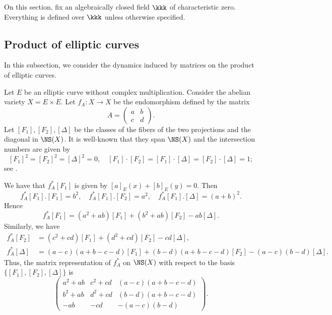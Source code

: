 On this section, fix an algebraically closed field \(\kkk\) of characteristic zero.
Everything is defined over \(\kkk\) unless otherwise specified.

\subsection{Product of elliptic curves}

    In this subsection, we consider the dynamics induced by matrices on the product of elliptic curves.

    Let \(E\) be an elliptic curve without complex multiplication.
    Consider the abelian variety \(X = E \times E\).
    Let \(f_A: X \to X\) be the endomorphism defined by the matrix
    \[ A = \begin{pmatrix}
        a & b \\
        c & d
    \end{pmatrix}. \]
    Let \([F_1], [F_2], [\Delta]\) be the classes of the fibers of the two projections and the diagonal in \(\NS(X)\).
    It is well-known that they span \(\NS(X)\) and the intersection numbers are given by
    \[ [F_1]^2 = [F_2]^2 = [\Delta]^2 = 0, \quad [F_1] \cdot [F_2] = [F_1] \cdot [\Delta] = [F_2] \cdot [\Delta] = 1; \]
    see \cite[Section 1.5.B]{Laz04a}.

    We have that \(f_A^*[F_1]\) is given by \([a]_E (x) + [b]_E (y) = 0\).
    Then
    \[ f_A^*[F_1].[F_1] = b^2, \quad f_A^*[F_1].[F_2] = a^2, \quad f_A^*[F_1].[\Delta] = (a+b)^2. \]
    Hence
    \[ f_A^*[F_1] = (a^2+ab) [F_1] + (b^2+ab) [F_2] - ab [\Delta]. \]
    Similarly, we have
    \begin{align*}
        f_A^*[F_2] &= (c^2+cd) [F_1] + (d^2+cd) [F_2] - cd [\Delta], \\
        f_A^*[\Delta] &= (a-c)(a+b-c-d) [F_1] + (b-d)(a+b-c-d) [F_2] - (a-c)(b-d) [\Delta].
    \end{align*}
    Thus, the matrix representation of \(f_A^*\) on \(\NS(X)\) with respect to the basis \(\{[F_1], [F_2], [\Delta]\}\) is
    \[
        \begin{pmatrix}
            a^2+ab & c^2+cd & (a-c)(a+b-c-d) \\
            b^2+ab & d^2+cd & (b-d)(a+b-c-d) \\
            -ab & -cd & -(a-c)(b-d)
        \end{pmatrix}.
    \]


